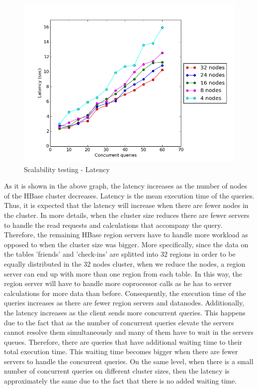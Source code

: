 \begin{figure}[H]
  \centering
  \includegraphics[height=0.6\textwidth]{figures/scalability_latency.png}
  \caption{Scalability testing - Latency}
\end{figure}


As it is shown in the above graph, the latency increases as the number of nodes of the HBase cluster decreases. Latency is the mean execution time of the queries. Thus, 
it is expected that the latency will increase when there are fewer nodes in the cluster. In more details, when the cluster size reduces there are fewer servers to 
handle the read requests and calculations that accompany the query. Therefore, the remaining HBase region servers have to handle more workload as opposed to when 
the cluster size was bigger. More specifically, since the data on the tables 'friends' and 'check-ins' are splitted into 32 regions in order to be equally 
distributed in the 32 nodes cluster, when we reduce the nodes, a region server can end up with more than one region from each table. In this way, the region 
server will have to handle more coprocessor calls as he has to server calculations for more data than before. Consequently, the execution time of the queries 
increases as there are fewer region servers and datanodes. Additionally, the latency increases as the client sends more concurrent queries. This happens due to the fact 
that as the number of concurrent queries elevate the servers cannot resolve them simultaneously and many of them have to wait in the servers queues. Therefore, 
there are queries that have additional waiting time to their total execution time. This waiting time becomes bigger when there are fewer servers to handle the 
concurrent queries. On the same level, when there is a small number of concurrent queries on different cluster sizes, then the latency is approximately the same 
due to the fact that there is no added waiting time. 


